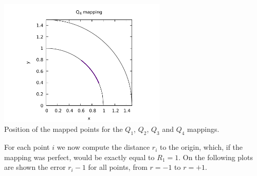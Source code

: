 \begin{center}
\includegraphics[width=8cm]{images/mappings/curved/xy4_line.pdf}\\
{\captionfont Position of the mapped points for the $Q_1$, $Q_2$, $Q_3$ and $Q_4$ mappings.}
\end{center}

For each point $i$ we now compute the distance $r_i$ 
to the origin, which, if the 
mapping was perfect, would be exactly equal to $R_1=1$. 
On the following plots are shown the error $r_i-1$ for all 
points, from $r=-1$ to $r=+1$.

